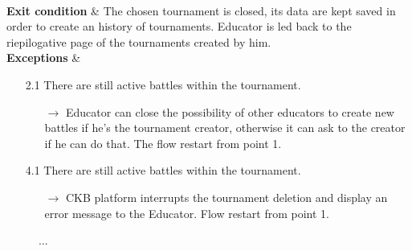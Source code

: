 \documentclass{article}
\begin{document}
{\begin{enumerate}
\begin{xltabular}{\textwidth}
\begin{enumerate}
                                                    \end{enumerate} \\
                        \hline
                        \textbf{Exit condition} & The chosen tournament is closed, its data are kept saved in
                        order to create an history of tournaments. Educator is led back to the riepilogative 
                        page of the tournaments created by him. \\
                        \hline
                        \textbf{Exceptions} &    \begin{itemize}
                                                    \item[2.1] There are still active battles within the tournament. 
                                                    \begin{itemize}
                                                        \item[$\rightarrow$] Educator can close the possibility of 
                                                        other educators to create new battles if he's the tournament
                                                        creator, otherwise it can ask to the creator if he can do
                                                        that. The flow restart from point 1.
                                                    \end{itemize} 
                                                    \item[4.1] There are still active battles within the tournament.
                                                    \begin{itemize}
                                                        \item[$\rightarrow$] CKB platform interrupts the tournament
                                                        deletion and display an error message to the Educator. Flow
                                                        restart from point 1.
                                                    \end{itemize} 
                                                \end{itemize}
                    \end{xltabular}
                    
                    \begin{figure}[H]
                        \centering
                        \caption{...}
                        \label{fig:BattleCreationSeqDiagram}
                    \end{figure}


\end{enumerate}}
\end{document}
